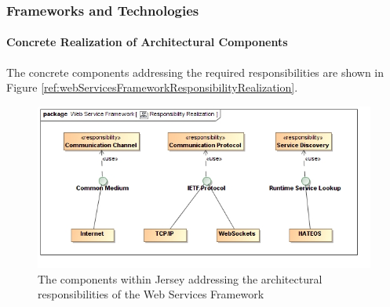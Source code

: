 \subsubsection{Frameworks and Technologies}
\paragraph{Concrete Realization of Architectural Components}
The concrete components addressing the required responsibilities are shown in Figure \ref{ref:webServicesFrameworkResponsibilityRealization}.
\begin{figure}[H]
	\begin{center}
	\includegraphics[scale=0.5]{../Diagrams and Charts/Web Services Framework/ResponsibilityRealization.jpg}
	\caption{The components within Jersey addressing the architectural responsibilities of the Web Services Framework}
	\label{fig:webServicesFrameworkResponsibilityRealization}
	\end{center}
\end{figure}